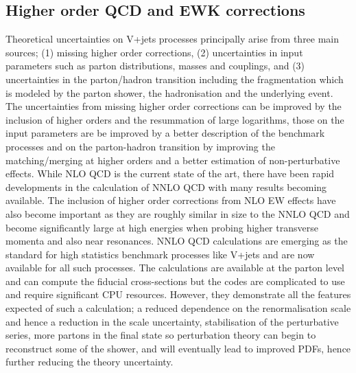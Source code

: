 \documentclass[a4paper,11pt,notoc]{article}
\begin{document}
\subsection{Higher order QCD and EWK corrections}
Theoretical uncertainties on V+jets processes principally arise from three main sources; (1) missing higher order corrections, (2) uncertainties in input parameters such as parton distributions, masses and couplings, and (3) uncertainties in the parton/hadron transition including the fragmentation which is modeled by the parton shower, the hadronisation and the underlying event. 
The uncertainties from missing higher order corrections can be improved by the inclusion of higher orders and the resummation of large logarithms, those on the input parameters are be improved by a better description of the benchmark processes and on the parton-hadron transition by improving the matching/merging at higher orders and a better estimation of non-perturbative effects. 
While NLO QCD is the current state of the art, there have been rapid developments in the calculation of NNLO QCD with many results becoming available. The inclusion of higher order corrections from NLO EW effects have also become important as they are roughly similar in size to the NNLO QCD and become significantly large at high energies when probing higher transverse momenta and also near resonances.
 NNLO QCD calculations are emerging as the standard for high statistics benchmark processes like V+jets and are now available for all such processes. The calculations are available at the parton level and can compute the fiducial cross-sections but the codes are complicated to use and require significant CPU resources. However, they demonstrate all the features expected of such a calculation; a reduced dependence on the renormalisation scale and hence a reduction in the scale uncertainty, stabilisation of the perturbative series, more partons in the final state so perturbation theory can begin to reconstruct some of the shower, and will eventually lead to improved PDFs, hence further reducing the theory uncertainty.
\end{document}
